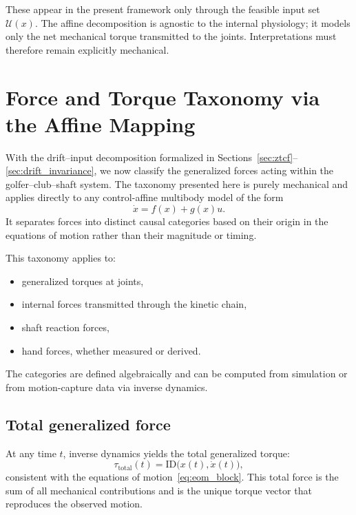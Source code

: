 \documentclass[12pt]{article}
\newcommand{\xd}{\dot{x}}
\begin{document}
These appear in the present framework only through the feasible input set \(\mathcal{U}(x)\).  
The affine decomposition is agnostic to the internal physiology; it models only the net mechanical torque transmitted to the joints.  
Interpretations must therefore remain explicitly mechanical.

\section{Force and Torque Taxonomy via the Affine Mapping}
\label{sec:taxonomy}

With the drift--input decomposition formalized in Sections~\ref{sec:ztcf}--\ref{sec:drift_invariance}, we now classify the generalized forces acting within the golfer--club--shaft system. The taxonomy presented here is purely mechanical and applies directly to any control-affine multibody model of the form
\[
  \xd = f(x) + g(x)u.
\]
It separates forces into distinct causal categories based on their origin in the equations of motion rather than their magnitude or timing.

This taxonomy applies to:
\begin{itemize}
  \item generalized torques at joints,
  \item internal forces transmitted through the kinetic chain,
  \item shaft reaction forces,
  \item hand forces, whether measured or derived.
\end{itemize}
The categories are defined algebraically and can be computed from simulation or from motion-capture data via inverse dynamics.

\subsection{Total generalized force}

At any time \(t\), inverse dynamics yields the total generalized torque:
\begin{equation}
  \tau_{\text{total}}(t)
  =
  \text{ID}\big(x(t),\xd(t)\big),
  \label{eq:total_tau}
\end{equation}
consistent with the equations of motion~\eqref{eq:eom_block}. This total force is the sum of all mechanical contributions and is the unique torque vector that reproduces the observed motion.
\end{document}
